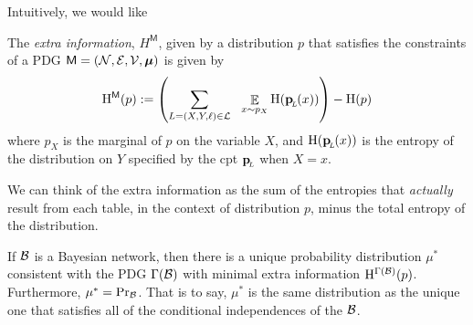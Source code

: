 \documentclass{article}
\newcommand{\bp}[1][L]{\mat{p}_{\!_#1\!}}
\newcommand{\sfM}{\mathsf M}
\numberwithin{equation}{section}
\begin{document}

	Intuitively, we would like 


	\begin{defn}
		The \emph{extra information}, $H^{\sfM}$, given by a distribution $p$ that satisfies the constraints of a PDG $\sfM = \mnvars[]$ is given by
		\[ \H^{\sfM}(p) := \left(\sum_{L = (X,Y, \ell)\in \cal L} ~~\E_{x \sim p_X}  \H (\bp (x)) \right) - \H(p) \] 
		where $p_X$ is the marginal of $p$ on the variable $X$, and $\H(\bp(x))$ is the entropy of the distribution on $Y$ specified by the cpt $\bp$ when $X = x$. 
	\end{defn}
	We can think of the extra information as the sum of the entropies that \emph{actually} result from each table, in the context of distribution $p$, minus the total entropy of the distribution.
	\begin{theorem}[restate=thmbnsRpdgs]\label{thm:bns-are-pdgs}
		If $\cal B$ is a Bayesian network, then there is a unique probability distribution $\mu^*$ consistent with the PDG $\Gamma(\cal B)$ with minimal extra information $\mathrm{H}^{\Gamma(\mathcal B)}(p)$. Furthermore, $\mu^* = \Pr_{\cal B}$. That is to say, $\mu^*$ is the same distribution as the unique one that satisfies all of the conditional independences of the $\cal B$.	
	\end{theorem}

	
\end{document}
